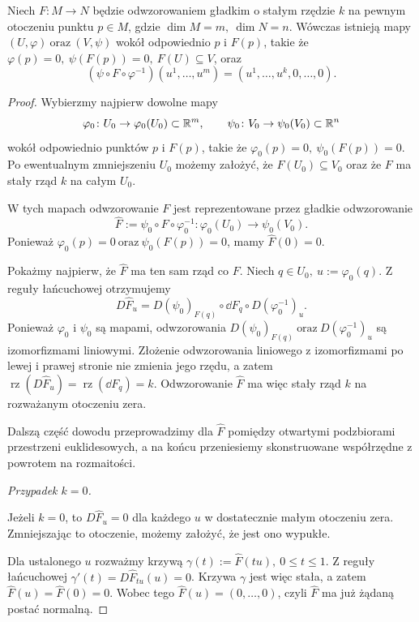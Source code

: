 \begin{twierdzenie}
\label{tw:rzad-staly}
Niech $F\colon M\to N$
będzie odwzorowaniem gładkim o stałym rzędzie $k$ na pewnym otoczeniu
punktu $p\in M$, gdzie $\dim M=m, \ \dim N=n$.
Wówczas istnieją mapy $(U,\varphi) \ \text{oraz}\ (V,\psi)$
wokół odpowiednio $p$ i $F(p)$, takie że $\varphi(p)=0, \ \psi(F(p))=0, \ F(U)\subseteq V$,
oraz
\[
(\psi\circ F\circ\varphi^{-1})(u^1,\dots,u^m)
=
(u^1,\dots,u^k,0,\dots,0).
\]
\end{twierdzenie}
\begin{proof}
Wybierzmy najpierw dowolne mapy
\[
\varphi_0\colon U_0\to\varphi_0(U_0)\subset\mathbb{R}^m, \qquad \psi_0\colon V_0\to\psi_0(V_0)\subset\mathbb{R}^n
\]
wokół odpowiednio punktów $p$ i $F(p)$, takie że $\varphi_0(p)=0, \ \psi_0(F(p))=0$.
Po ewentualnym zmniejszeniu $U_0$ możemy założyć, że $F(U_0)\subseteq V_0$
oraz że $F$ ma stały rząd $k$ na całym $U_0$.

W tych mapach odwzorowanie $F$ jest reprezentowane przez gładkie
odwzorowanie
\[
\widehat F := \psi_0\circ F\circ\varphi_0^{-1} \colon \varphi_0(U_0)\longrightarrow\psi_0(V_0).
\]
Ponieważ $\varphi_0(p)=0 \ \text{oraz}\ \psi_0(F(p))=0$,
mamy $\widehat F(0)=0$.

Pokażmy najpierw, że $\widehat F$ ma ten sam rząd co $F$.
Niech $q\in U_0, \ u:=\varphi_0(q)$.
Z reguły łańcuchowej otrzymujemy
\[
D\widehat F_u = D(\psi_0)_{F(q)} \circ \dd F_q \circ D(\varphi_0^{-1})_u.
\]
Ponieważ $\varphi_0$ i $\psi_0$ są mapami, odwzorowania $D(\psi_0)_{F(q)} \ \text{oraz}\ D(\varphi_0^{-1})_u$
są izomorfizmami liniowymi. Złożenie odwzorowania liniowego
z izomorfizmami po lewej i prawej stronie nie zmienia jego rzędu,
a zatem $\operatorname{rz}(D\widehat F_u) = \operatorname{rz}(\dd F_q) = k$.
Odwzorowanie $\widehat F$ ma więc stały rząd $k$ na rozważanym
otoczeniu zera.

Dalszą część dowodu przeprowadzimy dla $\widehat F$ pomiędzy
otwartymi podzbiorami przestrzeni euklidesowych, a na końcu
przeniesiemy skonstruowane współrzędne z powrotem na rozmaitości.

\medskip
\emph{Przypadek $k=0$.}

Jeżeli $k=0$, to $D\widehat F_u=0$
dla każdego $u$ w dostatecznie małym otoczeniu zera.
Zmniejszając to otoczenie, możemy założyć, że jest ono wypukłe.

Dla ustalonego $u$ rozważmy krzywą $\gamma(t):=\widehat F(tu), \ 0\leq t\leq1$.
Z reguły łańcuchowej $\gamma'(t) = D\widehat F_{tu}(u) = 0$.
Krzywa $\gamma$ jest więc stała, a zatem $\widehat F(u) = \widehat F(0) = 0$.
Wobec tego $\widehat F(u)=(0,\dots,0)$,
czyli $\widehat F$ ma już żądaną postać normalną.


\end{proof}
